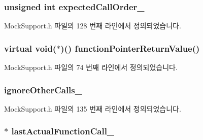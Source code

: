 \subsubsection[{\texorpdfstring{expected\+Call\+Order\+\_\+}{expectedCallOrder_}}]{\setlength{\rightskip}{0pt plus 5cm}unsigned int expected\+Call\+Order\+\_\+\hspace{0.3cm}{\ttfamily [private]}}\hypertarget{class_mock_support_afa5b7a7d70e8552f039255ae1d85f215}{}\label{class_mock_support_afa5b7a7d70e8552f039255ae1d85f215}


Mock\+Support.\+h 파일의 128 번째 라인에서 정의되었습니다.

\subsubsection[{\texorpdfstring{function\+Pointer\+Return\+Value}{functionPointerReturnValue}}]{\setlength{\rightskip}{0pt plus 5cm}virtual void($\ast$)() function\+Pointer\+Return\+Value()}\hypertarget{class_mock_support_adc6850dbb1a8c97f5d9974d38c7b1ba3}{}\label{class_mock_support_adc6850dbb1a8c97f5d9974d38c7b1ba3}


Mock\+Support.\+h 파일의 74 번째 라인에서 정의되었습니다.

\subsubsection[{\texorpdfstring{ignore\+Other\+Calls\+\_\+}{ignoreOtherCalls_}}]{ ignore\+Other\+Calls\+\_\+\hspace{0.3cm}{\ttfamily [private]}}\hypertarget{class_mock_support_a5a3b2bc086fdd2ca5aae69b37ea70942}{}\label{class_mock_support_a5a3b2bc086fdd2ca5aae69b37ea70942}


Mock\+Support.\+h 파일의 135 번째 라인에서 정의되었습니다.

\subsubsection[{\texorpdfstring{last\+Actual\+Function\+Call\+\_\+}{lastActualFunctionCall_}}]{$\ast$ last\+Actual\+Function\+Call\+\_\+\hspace{0.3cm}{\ttfamily [private]}}\hypertarget{class_mock_support_aadd48976efe51d36597ebe298e6b9233}{}\label{class_mock_support_aadd48976efe51d36597ebe298e6b9233}


